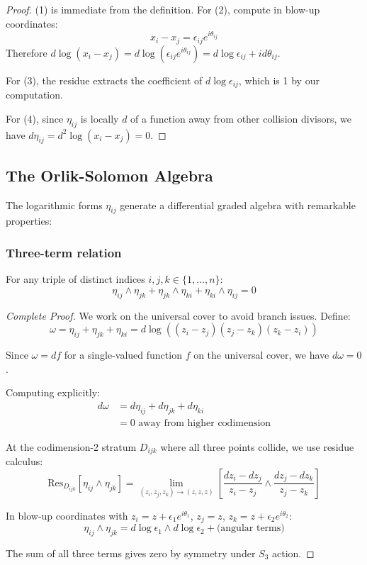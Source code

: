 \begin{proof}
(1) is immediate from the definition. For (2), compute in blow-up coordinates:
\[
x_i - x_j = \epsilon_{ij} e^{i\theta_{ij}}
\]
Therefore $d\log(x_i - x_j) = d\log(\epsilon_{ij} e^{i\theta_{ij}}) = d\log \epsilon_{ij} + id\theta_{ij}$.
 
For (3), the residue extracts the coefficient of $d\log \epsilon_{ij}$, which is 1 by our computation.
 
For (4), since $\eta_{ij}$ is locally $d$ of a function away from other collision divisors, we have $d\eta_{ij} = d^2\log(x_i - x_j) = 0$.
\end{proof}
 
\subsection{The Orlik-Solomon Algebra}
 
The logarithmic forms $\eta_{ij}$ generate a differential graded algebra with remarkable properties:

\subsubsection{Three-term relation}
\begin{theorem}
For any triple of distinct indices $i, j, k \in \{1,\ldots,n\}$:
$$\eta_{ij} \wedge \eta_{jk} + \eta_{jk} \wedge \eta_{ki} + \eta_{ki} \wedge \eta_{ij} = 0$$
\end{theorem}

\begin{proof}[Complete Proof]
We work on the universal cover to avoid branch issues. Define:
$$\omega = \eta_{ij} + \eta_{jk} + \eta_{ki} = d\log((z_i - z_j)(z_j - z_k)(z_k - z_i))$$

Since $\omega = df$ for a single-valued function $f$ on the universal cover, we have $d\omega = 0$.

Computing explicitly:
\begin{align}
d\omega &= d\eta_{ij} + d\eta_{jk} + d\eta_{ki}\\
&= 0 \text{ away from higher codimension}
\end{align}

At the codimension-2 stratum $D_{ijk}$ where all three points collide, we use residue calculus:
$$\text{Res}_{D_{ijk}}[\eta_{ij} \wedge \eta_{jk}] = \lim_{(z_i,z_j,z_k) \to (z,z,z)} \left[\frac{dz_i - dz_j}{z_i - z_j} \wedge \frac{dz_j - dz_k}{z_j - z_k}\right]$$

In blow-up coordinates with $z_i = z + \epsilon_1 e^{i\theta_1}$, $z_j = z$, $z_k = z + \epsilon_2 e^{i\theta_2}$:
$$\eta_{ij} \wedge \eta_{jk} = d\log\epsilon_1 \wedge d\log\epsilon_2 + \text{(angular terms)}$$

The sum of all three terms gives zero by symmetry under $S_3$ action.
\end{proof}
 
